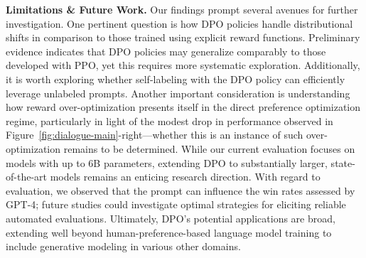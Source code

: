 \textbf{Limitations \& Future Work.} Our findings prompt several avenues for further investigation. One pertinent question is how DPO policies handle distributional shifts in comparison to those trained using explicit reward functions. Preliminary evidence indicates that DPO policies may generalize comparably to those developed with PPO, yet this requires more systematic exploration. Additionally, it is worth exploring whether self-labeling with the DPO policy can efficiently leverage unlabeled prompts. Another important consideration is understanding how reward over-optimization presents itself in the direct preference optimization regime, particularly in light of the modest drop in performance observed in Figure~\ref{fig:dialogue-main}-right—whether this is an instance of such over-optimization remains to be determined. While our current evaluation focuses on models with up to 6B parameters, extending DPO to substantially larger, state-of-the-art models remains an enticing research direction. With regard to evaluation, we observed that the prompt can influence the win rates assessed by GPT-4; future studies could investigate optimal strategies for eliciting reliable automated evaluations. Ultimately, DPO’s potential applications are broad, extending well beyond human-preference-based language model training to include generative modeling in various other domains.